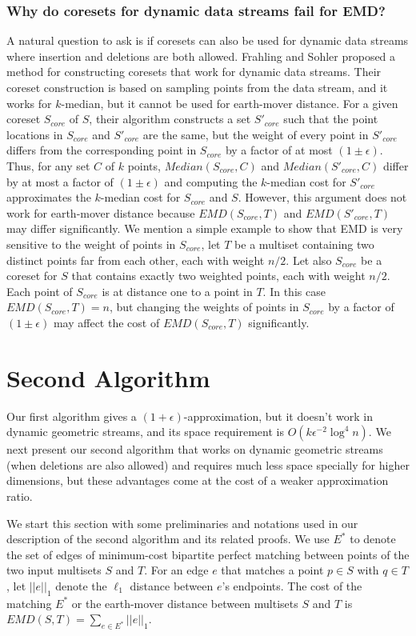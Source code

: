 \documentclass[oribibl]{llncs}
\begin{document}
\subsubsection{Why do coresets for dynamic data streams fail for EMD?}
A natural question to ask is if coresets can also be used for dynamic data
streams where insertion and deletions are both allowed.
Frahling and Sohler \cite{coreset_dynamic}
proposed a method for constructing coresets that work for dynamic data streams.
Their coreset construction is based on sampling points from the
data stream, and it works for $k$-median, but it cannot be
used for earth-mover distance.
For a given coreset $S_{core}$ of $S$, their algorithm constructs
a set $S'_{core}$ such that the point locations in $S_{core}$ and
$S'_{core}$ are the same, but the weight of every point in $S'_{core}$
differs from the corresponding point in $S_{core}$ by a factor of
at most $(1 \pm\epsilon)$.
Thus, for any set $C$ of $k$ points, $Median(S_{core},C)$ and
$Median(S'_{core},C)$ differ by at most a factor of $(1 \pm\epsilon)$
and computing the $k$-median cost for $S'_{core}$ approximates
the $k$-median cost for $S_{core}$ and $S$.
However, this argument does not work for earth-mover distance because
$EMD(S_{core},T)$ and $EMD(S'_{core},T)$ may differ 
significantly.
We mention a simple example to show that EMD is very sensitive to
the weight of points in $S_{core}$, 
let $T$ be a multiset containing two distinct points far from each other,
each with weight $n/2$.
Let also $S_{core}$ be a coreset for $S$ that contains
exactly two weighted points, each with weight $n/2$.
Each point of $S_{core}$ is at distance one to a point in $T$.
In this case $EMD(S_{core},T) = n$, but changing the weights of points in
$S_{core}$ by a factor of $(1\pm\epsilon)$ may affect the cost of
$EMD(S_{core},T)$ significantly.

\section{Second Algorithm}\label{algorithm2}
Our first algorithm gives a $(1+\epsilon)$-approximation, but it doesn't work
in dynamic geometric streams, and its space requirement is
$O(k\epsilon^{-2}\log^{4}n)$.
We next present our second algorithm that works on dynamic geometric streams
(when deletions are also allowed) and requires much less space specially for
higher dimensions, but these advantages come at the cost of a weaker
approximation ratio.
 
We start this section with some preliminaries and notations
used in our description of the second algorithm and its related proofs.
We use $E^*$ to denote the set of edges of minimum-cost bipartite perfect
matching between points of the two input multisets $S$ and $T$. 
For an edge $e$ that matches a point $p\in S$
with $q\in T$, let $||e||_1$ denote the $\ell_1$ distance between $e$'s
endpoints.
The cost of the matching $E^*$ or the earth-mover
distance between multisets $S$ and $T$ is $EMD(S,T) = \sum_{e\in E^*}||e||_1$.
\end{document}
